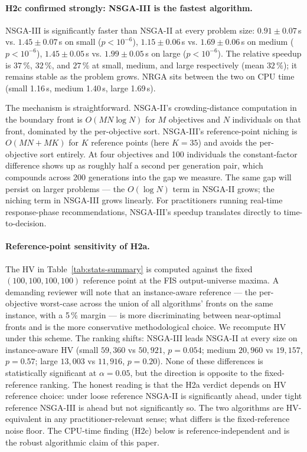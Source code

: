 \documentclass[applsci,article,submit,moreauthors,pdftex]{Definitions/mdpi}
\begin{document}
\paragraph{H2c confirmed strongly: NSGA-III is the fastest algorithm.}
NSGA-III is significantly faster than NSGA-II at every problem size:
$0.91 \pm 0.07$\,s vs. $1.45 \pm 0.07$\,s on small ($p < 10^{-6}$),
$1.15 \pm 0.06$\,s vs. $1.69 \pm 0.06$\,s on medium ($p < 10^{-6}$),
$1.45 \pm 0.05$\,s vs. $1.99 \pm 0.05$\,s on large ($p < 10^{-6}$). The
relative speedup is $37\,\%$, $32\,\%$, and $27\,\%$ at small, medium, and
large respectively (mean $32\,\%$); it remains stable as the problem grows. NRGA sits between the two on CPU time
(small 1.16\,s, medium 1.40\,s, large 1.69\,s).

The mechanism is straightforward. NSGA-II's crowding-distance computation
in the boundary front is $O(M N \log N)$ for $M$ objectives and $N$
individuals on that front, dominated by the per-objective sort. NSGA-III's
reference-point niching is $O(M N + M K)$ for $K$ reference points
(here $K = 35$) and avoids the per-objective sort entirely. At four
objectives and 100 individuals the constant-factor difference shows up as
roughly half a second per generation pair, which compounds across 200
generations into the gap we measure. The same gap will persist on larger
problems --- the $O(\log N)$ term in NSGA-II grows; the niching term in
NSGA-III grows linearly. For practitioners running real-time response-phase
recommendations, NSGA-III's speedup translates directly to time-to-decision.

\paragraph{Reference-point sensitivity of H2a.}
The HV in Table~\ref{tab:stats-summary} is computed against the fixed
$(100, 100, 100, 100)$ reference point at the FIS output-universe maxima.
A demanding reviewer will note that an instance-aware reference ---
the per-objective worst-case across the union of all algorithms' fronts
on the same instance, with a 5\,\% margin --- is more discriminating
between near-optimal fronts and is the more conservative methodological
choice. We recompute HV under this scheme. The ranking shifts:
NSGA-III leads NSGA-II at every size on instance-aware HV (small
$59{,}360$ vs $50{,}921$, $p = 0.054$; medium $20{,}960$ vs $19{,}157$,
$p = 0.57$; large $13{,}003$ vs $11{,}916$, $p = 0.20$). None of these
differences is statistically significant at $\alpha = 0.05$, but the
direction is opposite to the fixed-reference ranking. The honest
reading is that the H2a verdict depends on HV reference choice: under
loose reference NSGA-II is significantly ahead, under tight reference
NSGA-III is ahead but not significantly so. The two algorithms are
HV-equivalent in any practitioner-relevant sense; what differs is the
fixed-reference noise floor. The CPU-time finding (H2c) below is
reference-independent and is the robust algorithmic claim of this
paper.
\end{document}
